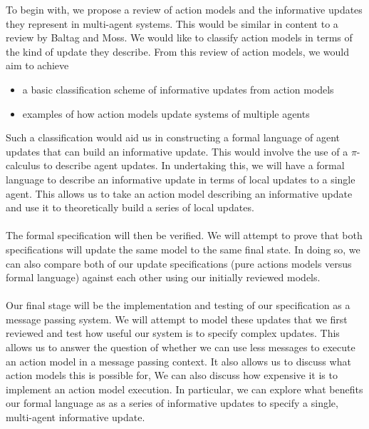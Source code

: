 \documentclass[12pt, a4paper]{article}
\begin{document}
To begin with, we propose a review of action models and the informative updates they represent in multi-agent systems.
This would be similar in content to a review by Baltag and Moss. \cite{logicsForEpistemicPrograms}
We would like to classify action models in terms of the kind of update they describe.
From this review of action models, we would aim to achieve
\begin{itemize}
	\item a basic classification scheme of informative updates from action models
	\item examples of how action models update systems of multiple agents
\end{itemize}

Such a classification would aid us in constructing a formal language of agent updates that can build an informative update.
This would involve the use of a $\pi$-calculus to describe agent updates.
In undertaking this, we will have a formal language to describe an informative update in terms of local updates to a single agent.
This allows us to take an action model describing an informative update and use it to theoretically build a series of local updates.\\
\\
The formal specification will then be verified.
We will attempt to prove that both specifications will update the same model to the same final state.
In doing so, we can also compare both of our update specifications (pure actions models versus formal language) against each other using our initially reviewed models.\\
\\
Our final stage will be the implementation and testing of our specification as a message passing system.
We will attempt to model these updates that we first reviewed and test how useful our system is to specify complex updates.
This allows us to answer the question of whether we can use less messages to execute an action model in a message passing context.
It also allows us to discuss what action models this is possible for, 
We can also discuss how expensive it is to implement an action model execution.
In particular, we can explore what benefits our formal language as as a series of informative updates to specify a single, multi-agent informative update.

%
\end{document}
